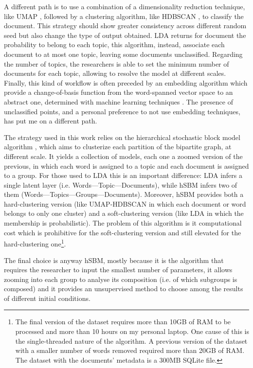 \documentclass[a4paper, 11pt, headings=standardclasses, tablecaptionsbelow]{scrartcl}
\begin{document}
A different path is to use a combination of a dimensionality reduction technique, like UMAP \parencite{mcinnes2020}, followed by a clustering algorithm, like HDBSCAN \parencite{campello2013,mcinnes2017}, to classify the document. This strategy should show greater consistency across different random seed but also change the type of output obtained. LDA returns for document the probability to belong to each topic, this algorithm, instead, associate each document to at most one topic, leaving some documents unclassified. Regarding the number of topics, the researchers is able to set the minimum number of documents for each topic, allowing to resolve the model at different scales. Finally, this kind of workflow is often preceded by an embedding algorithm which provide a change-of-basis function from the word-spanned vector space to an abstract one, determined with machine learning techniques \parencite{angelov2020,grootendorst2022}.
The presence of unclassified points, and a personal preference to not use embedding techniques, has put me on a different path.

The strategy used in this work relies on the hierarchical stochastic block model algorithm \parencite[hSBM][]{peixoto2019,gerlach2018}, which aims to clusterize each partition of the bipartite graph, at different scale. It yields a collection of models, each one a zoomed version of the previous, in which each word is assigned to a topic and each document is assigned to a group. For those used to LDA this is an important difference: LDA infers a single latent layer (i.e. Words---Topic---Documents), while hSBM infers two of them (Words---Topics---Groups---Documents). Moreover, hSBM provides both a hard-clustering version (like UMAP-HDBSCAN in which each document or word belongs to only one cluster) and a soft-clustering version (like LDA in which the membership is probabilistic). The problem of this algorithm is it computational cost which is prohibitive for the soft-clustering version and still elevated for the hard-clustering one\footnote{The final version of the dataset requires more than 10GB of RAM to be processed and more than 10 hours on my personal laptop. One cause of this is the single-threaded nature of the algorithm. A previous version of the dataset with a smaller number of words removed required more than 20GB of RAM. The dataset with the documents' metadata is a 300MB SQLite file.}.

The final choice is anyway hSBM, mostly because it is the algorithm that requires the researcher to input the smallest number of parameters, it allows zooming into each group to analyse its composition (i.e. of which subgroups is composed) and it provides an unsupervised method to choose among the results of different initial conditions.
\end{document}

